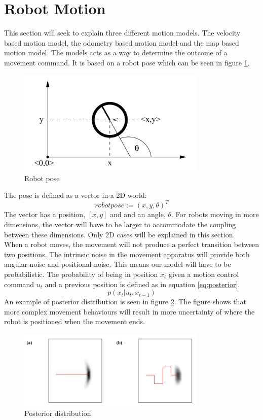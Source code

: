 \section{Robot Motion}
This section will seek to explain three different motion models. The velocity based motion model, the odometry based motion model and the map based motion model. The models acts as a way to determine the outcome of a movement command. It is based on a robot pose which can be seen in figure \ref{fig:robotpose}.
\begin{figure}[H]
\centering
\includegraphics[width=0.8\textwidth]{billeder/robotpose}
\caption{Robot pose}
\label{fig:robotpose}
\end{figure}
The pose is defined as a vector in a 2D world:
\begin{equation}
robotpose := ( x, y, \theta ) ^T
\end{equation}
The vector has a position, $[ x, y ]$ and and an angle, $\theta$. For robots moving in more dimensions, the vector will have to be larger to accommodate the coupling between these dimensions. Only 2D cases will be explained in this section.\\

When a robot moves, the movement will not produce a perfect transition between two positions. The intrinsic noise in the movement apparatus will provide both angular noise and positional noise. This means our model will have to be probabilistic. The probability of being in position $x_t$ given a motion control command $u_t$ and a previous position is defined as in equation \ref{eq:posterior}.
\begin{equation}
p(x_t | u_t, x_{t-1})
\label{eq:posterior}
\end{equation}
An example of posterior distribution is seen in figure \ref{fig:postdist}. The figure shows that more complex movement behaviours will result in more uncertainty of where the robot is positioned when the movement ends.
\begin{figure}[H]
\centering
\includegraphics[width=0.8\textwidth]{billeder/postdist}
\caption{Posterior distribution}
\label{fig:postdist}
\end{figure}

